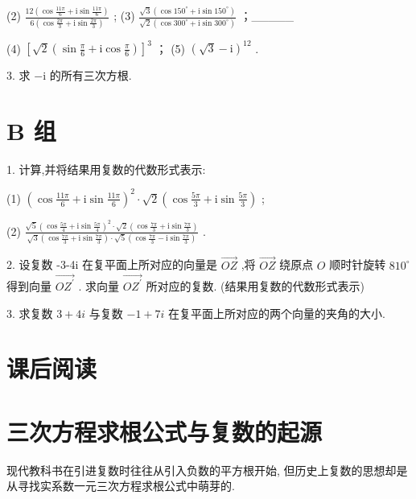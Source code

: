\documentclass[10pt]{article}
\begin{document}
(2) \(\frac{{12}\left( {\cos \frac{11\pi }{6} + \mathrm{i}\sin \frac{11\pi }{6}}\right) }{6\left( {\cos \frac{2\pi }{3} + \mathrm{i}\sin \frac{2\pi }{3}}\right) }\) ; (3) \(\frac{\sqrt{3}\left( {\cos {150}^{ \circ  } + \mathrm{i}\sin {150}^{ \circ  }}\right) }{\sqrt{2}\left( {\cos {300}^{ \circ  } + \mathrm{i}\sin {300}^{ \circ  }}\right) }\) ；\_\_\_\_\_

(4) \({\left\lbrack  \sqrt{2}\left( \sin \frac{\pi }{6} + \mathrm{i}\cos \frac{\pi }{6}\right) \right\rbrack  }^{3}\) ； (5) \({\left( \sqrt{3} - \mathrm{i}\right) }^{12}\) .

3. 求 \(- \mathrm{i}\) 的所有三次方根.

\section*{B 组}

1. 计算,并将结果用复数的代数形式表示:

(1) \({\left( \cos \frac{11\pi }{6} + \mathrm{i}\sin \frac{11\pi }{6}\right) }^{2} \cdot  \sqrt{2}\left( {\cos \frac{5\pi }{3} + \mathrm{i}\sin \frac{5\pi }{3}}\right)\) ;

(2) \(\frac{\sqrt{5}{\left( \cos \frac{5\pi }{4} + \mathrm{i}\sin \frac{5\pi }{4}\right) }^{2} \cdot  \sqrt{2}\left( {\cos \frac{7\pi }{3} + \mathrm{i}\sin \frac{7\pi }{3}}\right) }{\sqrt{3}\left( {\cos \frac{7\pi }{3} + \mathrm{i}\sin \frac{7\pi }{3}}\right)  \cdot  \sqrt{5}\left( {\cos \frac{7\pi }{3} - \mathrm{i}\sin \frac{7\pi }{3}}\right) }\) .

2. 设复数 -3-4i 在复平面上所对应的向量是 \(\overrightarrow{OZ}\) ,将 \(\overrightarrow{OZ}\) 绕原点 \(O\) 顺时针旋转 \({810}^{ \circ  }\) 得到向量 \(\overrightarrow{O{Z}^{\prime }}\) . 求向量 \(\overrightarrow{O{Z}^{\prime }}\) 所对应的复数. (结果用复数的代数形式表示)

3. 求复数 \(3 + {4i}\) 与复数 \(- 1 + {7i}\) 在复平面上所对应的两个向量的夹角的大小.

\section*{课后阅读}

\section*{三次方程求根公式与复数的起源}

现代教科书在引进复数时往往从引入负数的平方根开始, 但历史上复数的思想却是从寻找实系数一元三次方程求根公式中萌芽的.
\end{document}
